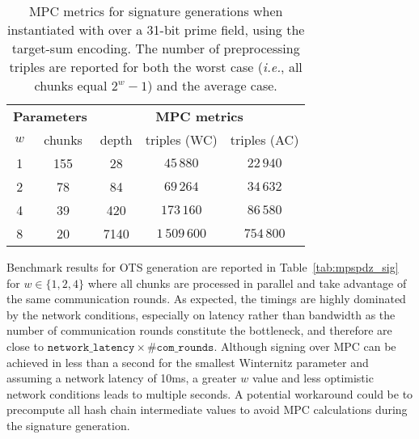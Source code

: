 \begin{table}[htbp]
	\centering
	\begin{tabular}{ccccc}
		\toprule
    		\multicolumn{2}{c}{\textbf{Parameters}}  & \multicolumn{3}{c}{\textbf{MPC metrics}} \\
    		 {$w$} & chunks  &  depth & triples (WC) & triples (AC) \\
    		\midrule
 	 1 & 155 &  28  & $45\,880$     & $22\,940$ \\
	 2 & 78  &  84  & $69\,264$     & $34\,632$ \\
	 4 & 39  &  420 & $173\,160$    & $86\,580$ \\
	 8 & 20  & 7140 & $1\,509\,600$ & $754\,800$ \\
	\hline
	\end{tabular}
	\caption{MPC metrics for \XMSS signature generations when instantiated with \PoseidonTwo over a 31-bit prime field, using the target-sum encoding. The number of preprocessing triples are reported for both the worst case (\textit{i.e.}, all chunks equal $2^w-1$) and the average case.\label{tab:xmss_sig_tsw}}
\end{table}

\noindent Benchmark results for OTS generation are reported in Table~\ref{tab:mpspdz_sig} for $w \in \{1,2,4\}$ where all chunks are processed in parallel and take advantage of the same communication rounds.
As expected, the timings are highly dominated by the network conditions, especially on latency rather than bandwidth as the number of communication rounds constitute the bottleneck, and therefore are close to $\mathtt{network\_latency} \times \#\mathtt{com\_rounds}$.
Although signing over MPC can be achieved in less than a second for the smallest Winternitz parameter and assuming a network latency of 10ms, a greater $w$ value and less optimistic network conditions leads to multiple seconds.
A potential workaround could be to precompute all hash chain intermediate values to avoid MPC calculations during the signature generation.


